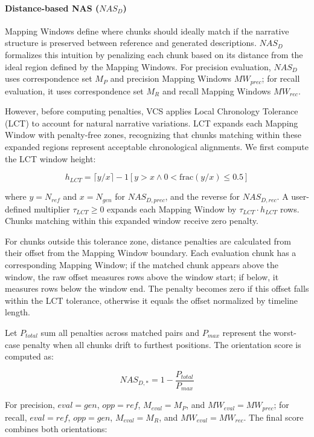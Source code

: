 \documentclass[letterpaper]{article} %
\begin{document}
\paragraph{Distance-based NAS ($NAS_D$)}
Mapping Windows define where chunks should ideally match if the narrative structure is preserved between reference and generated descriptions. $NAS_D$ formalizes this intuition by penalizing each chunk based on its distance from the ideal region defined by the Mapping Windows. For precision evaluation, $NAS_D$ uses correspondence set $M_P$ and precision Mapping Windows $MW_{prec}$; for recall evaluation, it uses correspondence set $M_R$ and recall Mapping Windows $MW_{rec}$.

However, before computing penalties, VCS applies Local Chronology Tolerance (LCT) to account for natural narrative variations. LCT expands each Mapping Window with penalty-free zones, recognizing that chunks matching within these expanded regions represent acceptable chronological alignments. We first compute the LCT window height:

\begin{equation}
h_{LCT} = \lceil y/x \rceil - 1[y > x \land 0 < \text{frac}(y/x) \leq 0.5]
\end{equation}

where $y = N_{ref}$ and $x = N_{gen}$ for $NAS_{D,prec}$, and the reverse for $NAS_{D,rec}$. A user-defined multiplier $\tau_{LCT} \geq 0$ expands each Mapping Window by $\tau_{LCT} \cdot h_{LCT}$ rows. Chunks matching within this expanded window receive zero penalty.

For chunks outside this tolerance zone, distance penalties are calculated from their offset from the Mapping Window boundary. Each evaluation chunk has a corresponding Mapping Window; if the matched chunk appears above the window, the raw offset measures rows above the window start; if below, it measures rows below the window end. The penalty becomes zero if this offset falls within the LCT tolerance, otherwise it equals the offset normalized by timeline length.

Let $P_{total}$ sum all penalties across matched pairs and $P_{max}$ represent the worst-case penalty when all chunks drift to furthest positions. The orientation score is computed as:

\begin{equation}
NAS_{D,*} = 1 - \frac{P_{total}}{P_{max}}
\end{equation}

For precision, $eval = gen$, $opp = ref$, $M_{eval} = M_P$, and $MW_{eval} = MW_{prec}$; for recall, $eval = ref$, $opp = gen$, $M_{eval} = M_R$, and $MW_{eval} = MW_{rec}$. The final score combines both orientations:
\end{document}
